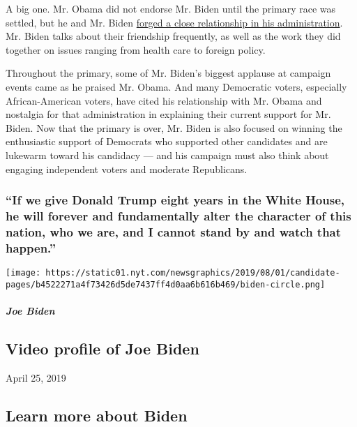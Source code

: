 A big one. Mr. Obama did not endorse Mr. Biden until the primary race
was settled, but he and Mr. Biden
\href{https://www.nytimes.com/2019/08/16/us/politics/biden-obama-history.html}{forged
a close relationship in his administration}. Mr. Biden talks about their
friendship frequently, as well as the work they did together on issues
ranging from health care to foreign policy.

Throughout the primary, some of Mr. Biden's biggest applause at campaign
events came as he praised Mr. Obama. And many Democratic voters,
especially African-American voters, have cited his relationship with Mr.
Obama and nostalgia for that administration in explaining their current
support for Mr. Biden. Now that the primary is over, Mr. Biden is also
focused on winning the enthusiastic support of Democrats who supported
other candidates and are lukewarm toward his candidacy --- and his
campaign must also think about engaging independent voters and moderate
Republicans.

\hypertarget{if-we-give-donald-trump-eight-years-in-the-white-house-he-will-forever-and-fundamentally-alter-the-character-of-this-nation-who-we-are-and-i-cannot-stand-by-and-watch-that-happen}{%
\subsubsection{``If we give Donald Trump eight years in the White House,
he will forever and fundamentally alter the character of this nation,
who we are, and I cannot stand by and watch that
happen.''}\label{if-we-give-donald-trump-eight-years-in-the-white-house-he-will-forever-and-fundamentally-alter-the-character-of-this-nation-who-we-are-and-i-cannot-stand-by-and-watch-that-happen}}

\texttt{[image: https://static01.nyt.com/newsgraphics/2019/08/01/candidate-pages/b4522271a4f73426d5de7437ff4d0aa6b616b469/biden-circle.png]}

\hypertarget{joe-biden-1}{%
\subparagraph{Joe Biden}\label{joe-biden-1}}

\hypertarget{video-profile-of-joe-biden}{%
\subsection{Video profile of Joe
Biden}\label{video-profile-of-joe-biden}}

April 25, 2019

\hypertarget{learn-more-about-biden}{%
\subsection{Learn more about Biden}\label{learn-more-about-biden}}

